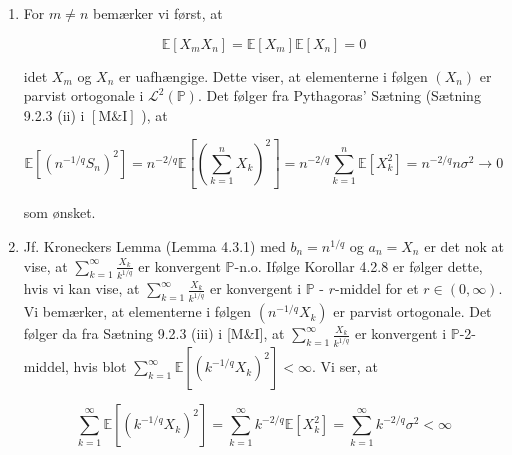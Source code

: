 \documentclass{Class}
\begin{document}
\begin{enumerate}
    \item For $m \neq n$ bemærker vi først, at

    $$
    \mathbb{E}\left[X_m X_n\right]=\mathbb{E}\left[X_m\right] \mathbb{E}\left[X_n\right]=0
    $$
    
    idet $X_m$ og $X_n$ er uafhængige. Dette viser, at elementerne i følgen $\left(X_n\right)$ er parvist ortogonale i $\mathcal{L}^2(\mathbb{P})$. Det følger fra Pythagoras' Sætning (Sætning 9.2.3 (ii) i $[\mathrm{M} \& \mathrm{I}]$ ), at
    
    $$
    \mathbb{E}\left[\left(n^{-1 / q} S_n\right)^2\right]=n^{-2 / q} \mathbb{E}\left[\left(\sum_{k=1}^n X_k\right)^2\right]=n^{-2 / q} \sum_{k=1}^n \mathbb{E}\left[X_k^2\right]=n^{-2 / q} n \sigma^2 \rightarrow 0
    $$
    
    som ønsket.
    \item Jf. Kroneckers Lemma (Lemma 4.3.1) med $b_n=n^{1 / q}$ og $a_n=X_n$ er det nok at vise, at $\sum_{k=1}^{\infty} \frac{X_k}{k^{1 / q}}$ er konvergent $\mathbb{P}$-n.o. Ifølge Korollar 4.2.8 er følger dette, hvis vi kan vise, at $\sum_{k=1}^{\infty} \frac{X_k}{k^{1 / q}}$ er konvergent i $\mathbb{P}$ - $r$-middel for et $r \in(0, \infty)$. Vi bemærker, at elementerne i følgen $\left(n^{-1 / q} X_k\right)$ er parvist ortogonale. Det følger da fra Sætning 9.2.3 (iii) i [M\&I], at $\sum_{k=1}^{\infty} \frac{X_k}{k^{1 / q}}$ er konvergent i $\mathbb{P}$-2-middel, hvis blot $\sum_{k=1}^{\infty} \mathbb{E}\left[\left(k^{-1 / q} X_k\right)^2\right]<\infty$. Vi ser, at

    $$
    \sum_{k=1}^{\infty} \mathbb{E}\left[\left(k^{-1 / q} X_k\right)^2\right]=\sum_{k=1}^{\infty} k^{-2 / q} \mathbb{E}\left[X_k^2\right]=\sum_{k=1}^{\infty} k^{-2 / q} \sigma^2<\infty
    $$
    

\end{enumerate}
\end{document}
